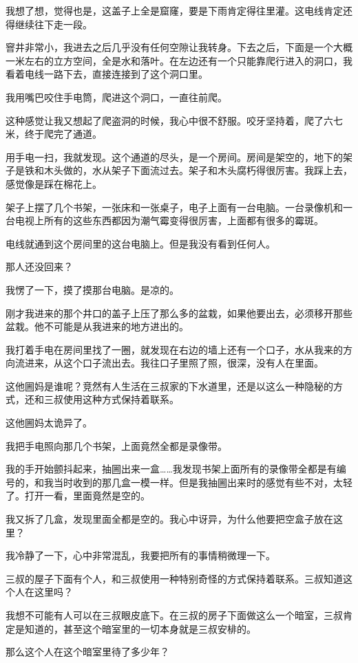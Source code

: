 我想了想，觉得也是，这盖子上全是窟窿，要是下雨肯定得往里灌。这电线肯定还得继续往下走一段。

窨井非常小，我进去之后几乎没有任何空隙让我转身。下去之后，下面是一个大概一米左右的立方空间，全是水和落叶。在左边还有一个只能靠爬行进入的洞口，我看着电线一路下去，直接连接到了这个洞口里。

我用嘴巴咬住手电筒，爬进这个洞口，一直往前爬。

这种感觉让我又想起了爬盗洞的时候，我心中很不舒服。咬牙坚持着，爬了六七米，终于爬完了通道。

用手电一扫，我就发现。这个通道的尽头，是一个房间。房间是架空的，地下的架子是铁和木头做的，水从架子下面流过去。架子和木头腐朽得很厉害。我踩上去，感觉像是踩在棉花上。

架子上摆了几个书架，一张床和一张桌子，电子上面有一台电脑。一台录像机和一台电视上所有的这些东西都因为潮气霉变得很厉害，上面都有很多的霉斑。

电线就通到这个房间里的这台电脑上。但是我没有看到任何人。

那人还没回来？

我愣了一下，摸了摸那台电脑。是凉的。

刚才我进来的那个井口的盖子上压了那么多的盆栽，如果他要出去，必须移开那些盆栽。他不可能是从我进来的地方进出的。

我打着手电在房间里找了一圈，就发现在右边的墙上还有一个口子，水从我来的方向流进来，从这个口子流出去。我往口子里照了照，很深，没有人在里面。

这他圌妈是谁呢？竞然有人生活在三叔家的下水道里，还是以这么一种隐秘的方式，还和三叔使用这种方式保持着联系。

这他圌妈太诡异了。

我把手电照向那几个书架，上面竟然全都是录像带。

我的手开始颤抖起来，抽圌出来一盒……我发现书架上面所有的录像带全都是有编号的，和我当时收到的那几盒一模一样。但是我抽圌出来时的感觉有些不对，太轻了。打开一看，里面竟然是空的。

我又拆了几盒，发现里面全都是空的。我心中讶异，为什么他要把空盒子放在这里？

我冷静了一下，心中非常混乱，我要把所有的事情稍微理一下。

三叔的屋子下面有个人，和三叔使用一种特别奇怪的方式保持着联系。三叔知道这个人在这里吗？

我想不可能有人可以在三叔眼皮底下。在三叔的房子下面做这么一个暗室，三叔肯定是知道的，甚至这个暗室里的一切本身就是三叔安棑的。

那么这个人在这个暗室里待了多少年？

